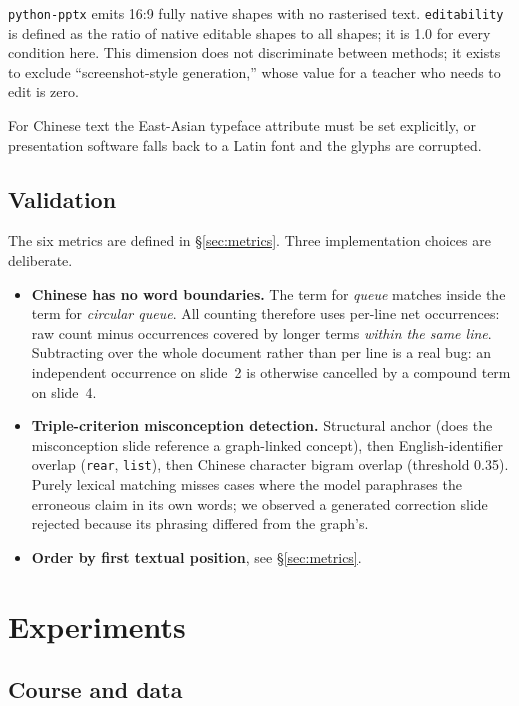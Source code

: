 \documentclass[review,12pt]{elsarticle}
\renewcommand{\_}{\kgunderscore\allowbreak}
\newcommand{\id}[1]{\texttt{#1}}
\begin{document}
\id{python-pptx} emits 16:9 fully native shapes with no rasterised text.
\id{editability} is defined as the ratio of native editable shapes to all shapes;
it is 1.0 for every condition here. This dimension does not discriminate between
methods; it exists to exclude ``screenshot-style generation,'' whose value for a
teacher who needs to edit is zero.

For Chinese text the East-Asian typeface attribute must be set explicitly, or
presentation software falls back to a Latin font and the glyphs are corrupted.

\subsection{Validation}

The six metrics are defined in \S\ref{sec:metrics}. Three implementation choices
are deliberate.

\begin{itemize}
  \item \textbf{Chinese has no word boundaries.} The term for \emph{queue} matches
  inside the term for \emph{circular queue}. All counting therefore uses per-line
  net occurrences: raw count minus occurrences covered by longer terms
  \emph{within the same line}. Subtracting over the whole document rather than
  per line is a real bug: an independent occurrence on slide~2 is otherwise
  cancelled by a compound term on slide~4.
  \item \textbf{Triple-criterion misconception detection.} Structural anchor
  (does the misconception slide reference a graph-linked concept), then
  English-identifier overlap (\id{rear}, \id{list}), then Chinese character
  bigram overlap (threshold 0.35). Purely lexical matching misses cases where
  the model paraphrases the erroneous claim in its own words; we observed a
  generated correction slide rejected because its phrasing differed from the
  graph's.
  \item \textbf{Order by first textual position}, see \S\ref{sec:metrics}.
\end{itemize}

\section{Experiments}

\subsection{Course and data}
\end{document}
